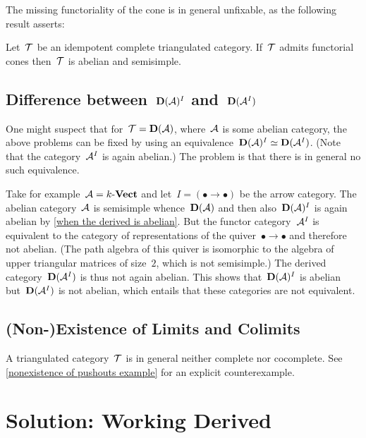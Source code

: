 \documentclass[a4paper,10pt]{scrartcl}
\begin{document}
The missing functoriality of the cone is in general unfixable, as the following result asserts:

\begin{proposition}
  Let~$\mathcal{T}$ be an idempotent complete triangulated category.
  If~$\mathcal{T}$ admits functorial cones then~$\mathcal{T}$ is abelian and semisimple.
\end{proposition}



\subsection{Difference between~$\mathbf{D}(\mathcal{A})^I$ and~$\mathbf{D}(\mathcal{A}^I)$}

One might suspect that for~$\mathcal{T} = \mathbf{D}(\mathcal{A})$, where~$\mathcal{A}$ is some abelian category, the above problems can be fixed by using an equivalence~$\mathbf{D}(\mathcal{A})^I \simeq \mathbf{D}(\mathcal{A}^I)$.
(Note that the category~$\mathcal{A}^I$ is again abelian.)
The problem is that there is in general no such equivalence.

Take for example~$\mathcal{A} = k\text{-}\mathbf{Vect}$ and let~$I = (\bullet \to \bullet)$ be the arrow category.
The abelian category~$\mathcal{A}$ is semisimple whence~$\mathbf{D}(\mathcal{A})$ and then also~$\mathbf{D}(\mathcal{A})^I$ is again abelian by \cref{when the derived is abelian}.
But the functor category~$\mathcal{A}^I$ is equivalent to the category of representations of the quiver~$\bullet \to \bullet$ and therefore not abelian.
(The path algebra of this quiver is isomorphic to the algebra of upper triangular matrices of size~$2$, which is not semisimple.)
The derived category~$\mathbf{D}(\mathcal{A}^I)$ is thus not again abelian.
This shows that~$\mathbf{D}(\mathcal{A})^I$ is abelian but~$\mathbf{D}(\mathcal{A}^I)$ is not abelian, which entails that these categories are not equivalent.



\subsection{(Non-)Existence of Limits and Colimits}
\label{nonexistence of pushouts}

A triangulated category~$\mathcal{T}$ is in general neither complete nor cocomplete.
See \cref{nonexistence of pushouts example} for an explicit counterexample.





\section{Solution: Working Derived}
\end{document}
